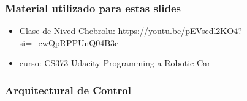 \begin{frame}
    \frametitle{Material utilizado para estas slides}
    
    \begin{itemize}
        \item Clase de Nived Chebrolu: \url{https://youtu.be/pEVsedl2KO4?si=_cwQpRPPUnQ04B3c}
        \item curso: CS373 Udacity Programming a Robotic Car
    \end{itemize}

    
\end{frame}

\begin{frame}
    \frametitle{Arquitectural de Control}
    
\end{frame}
